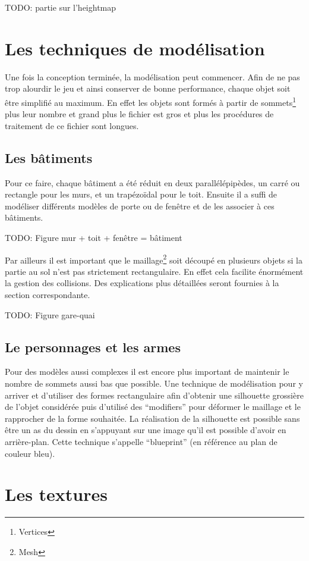 \documentclass[11pt]{report}
\begin{document}
TODO: partie sur l'heightmap

\section{Les techniques de modélisation}

Une fois la conception terminée, la modélisation peut commencer. Afin de ne pas trop alourdir le jeu et ainsi conserver de bonne performance, chaque objet soit être simplifié au maximum. En effet les objets sont formés à partir de sommets\footnote{Vertices} plus leur nombre et grand plus le fichier est gros et plus les procédures de traitement de ce fichier sont longues.

\subsection{Les bâtiments}

Pour ce faire, chaque bâtiment a été réduit en deux parallélépipèdes, un carré ou rectangle pour les murs, et un trapézoïdal pour le toit. Ensuite il a suffi de modéliser différents modèles de porte ou de fenêtre et de les associer à ces bâtiments.

TODO: Figure mur + toit + fenêtre = bâtiment

Par ailleurs il est important que le maillage\footnote{Mesh} soit découpé en plusieurs objets si la partie au sol n'est pas strictement rectangulaire. En effet cela facilite énormément la gestion des collisions. Des explications plus détaillées seront fournies à la section correspondante.

TODO: Figure gare-quai

\subsection{Le personnages et les armes}

Pour des modèles aussi complexes il est encore plus important de maintenir le nombre de sommets aussi bas que possible. Une technique de modélisation pour y arriver et d’utiliser des formes rectangulaire afin d’obtenir une silhouette grossière de l’objet considérée puis d’utilisé des ``modifiers'' pour déformer le maillage et le rapprocher de la forme souhaitée. La réalisation de la silhouette est possible sans être un as du dessin en s’appuyant sur une image qu’il est possible d’avoir en arrière-plan. Cette technique s’appelle ``blueprint'' (en référence au plan de couleur bleu).

\section{Les textures}
\end{document}
